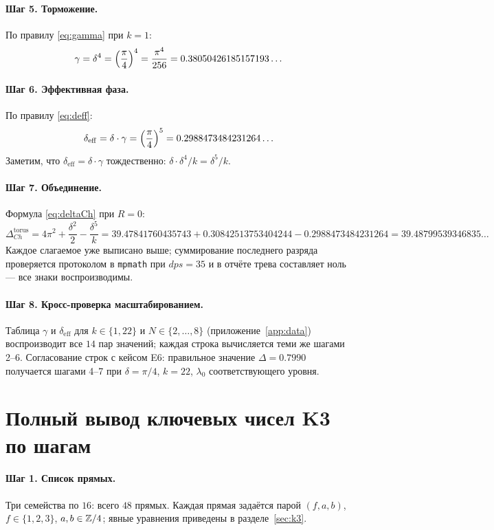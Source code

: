 \paragraph{Шаг 5. Торможение.} По правилу \eqref{eq:gamma} при $k=1$:
\[
  \gamma=\delta^4=\Bigl(\frac\pi4\Bigr)^4=\frac{\pi^4}{256}
  =0.38050426185157193\ldots
\]

\paragraph{Шаг 6. Эффективная фаза.} По правилу \eqref{eq:deff}:
\[
  \delta_{\mathrm{eff}}=\delta\cdot\gamma
  =\Bigl(\frac\pi4\Bigr)^5=0.2988473484231264\ldots
\]
Заметим, что $\delta_{\mathrm{eff}}=\delta\cdot\gamma$ тождественно:
$\delta\cdot\delta^4/k=\delta^5/k$.

\paragraph{Шаг 7. Объединение.} Формула \eqref{eq:deltaCh} при $R=0$:
\[
  \Delta_{Ch}^{\mathrm{torus}}
  =4\pi^2+\frac{\delta^2}{2}-\frac{\delta^5}{k}
  =39.47841760435743+0.30842513753404244-0.2988473484231264
  =39.48799539346835\ldots
\]
Каждое слагаемое уже выписано выше; суммирование последнего разряда
проверяется протоколом в \texttt{mpmath} при $dps=35$ и в отчёте
трева составляет ноль --- все знаки воспроизводимы.

\paragraph{Шаг 8. Кросс-проверка масштабированием.} Таблица
$\gamma$ и $\delta_{\mathrm{eff}}$ для $k\in\{1,22\}$ и
$N\in\{2,\dots,8\}$ (приложение~\ref{app:data}) воспроизводит все
$14$ пар значений; каждая строка вычисляется теми же шагами 2--6.
Согласование строк с кейсом E6: правильное значение $\Delta=0.7990$
получается шагами 4--7 при $\delta=\pi/4$, $k=22$, $\lambda_0$
соответствующего уровня.

\section{Полный вывод ключевых чисел K3 по шагам}\label{sec:workk3}

\paragraph{Шаг 1. Список прямых.} Три семейства по $16$: всего $48$
прямых. Каждая прямая задаётся парой $(f,a,b)$, $f\in\{1,2,3\}$,
$a,b\in\mathbb{Z}/4$; явные уравнения приведены в разделе~\ref{sec:k3}.

